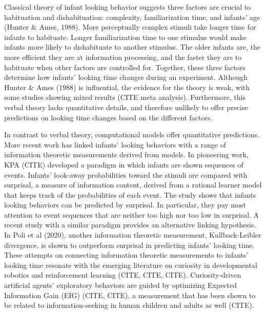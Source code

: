 \documentclass[10pt, letterpaper]{article}
\begin{document}
Classical theory of infant looking behavior suggests three factors are
crucial to habituation and dishabituation: complexity, familiarization
time, and infants' age (Hunter \& Ames, 1988). More perceptually complex
stimuli take longer time for infants to habituate. Longer
familiarization time to one stimulus would make infants more likely to
dishabituate to another stimulus. The older infants are, the more
efficient they are at information processing, and the faster they are to
habituate when other factors are controlled for. Together, these three
factors determine how infants' looking time changes during an
experiment. Although Hunter \& Ames (1988) is influential, the evidence
for the theory is weak, with some studies showing mixed results (CITE
meta analysis). Furthermore, this verbal theory lacks quantitative
details, and therefore unlikely to offer precise predictions on looking
time changes based on the different factors.

In contrast to verbal theory, computational models offer quantitative
predictions. More recent work has linked infants' looking behaviors with
a range of information theoretic measurements derived from models. In
pioneering work, KPA (CITE) developed a paradigm in which infants are
shown sequences of events. Infants' look-away probabilities toward the
stimuli are compared with surprisal, a measure of information content,
derived from a rational learner model that keeps track of the
probabilities of each event. The study shows that infants looking
behaviors can be predicted by surprisal. In particular, they pay most
attention to event sequences that are neither too high nor too low in
surprisal. A recent study with a similar paradigm provides an
alternative linking hypothesis. In Poli et al (2020), another
information theoretic measurement, Kullback-Leibler divergence, is shown
to outperform surprisal in predicting infants' looking time. These
attempts on connecting information theoretic measurements to infants'
looking time resonate with the emerging literature on curiosity in
developmental robotics and reinforcement learning (CITE, CITE, CITE).
Curiosity-driven artificial agents' exploratory behaviors are guided by
optimizing Expected Information Gain (EIG) (CITE, CITE), a measurement
that has been shown to be related to information-seeking in human
children and adults as well (CITE).
\end{document}
